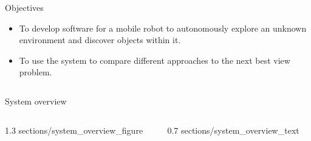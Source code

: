 \documentclass[final,20pt]{beamer}
\newlength{\sepwid}
\newlength{\onecolwid}
\newlength{\twocolwid}
\begin{document}
\begin{frame}[t]
\begin{columns}[t]
\begin{column}{\twocolwid}
\begin{columns}[t,totalwidth=\twocolwid]
\begin{column}{\onecolwid}
			\begin{alertblock}{Objectives}

			\Large{
			\begin{itemize}
				\item To develop software for a mobile robot to autonomously explore an unknown environment and discover objects within it.
				\item To use the system to compare different approaches to the next best view problem.
			\end{itemize}}

			\end{alertblock}

		\end{column}

	\end{columns}



	\begin{block}{System overview}

	\begin{columns}[c, totalwidth=\twocolwid]

		\begin{column}{1.3\onecolwid}
			{sections/system_overview_figure}
		\end{column}


		\begin{column}{0.7\onecolwid}
			{sections/system_overview_text}
		\end{column}

	\end{columns}

	\end{block}
	
	\begin{columns}[t, totalwidth=\twocolwid]

		\begin{column}{\onecolwid}

			\vspace{2cm}

	

\end{column}
\end{columns}
\end{column}
\end{columns}
\end{frame}
\end{document}
